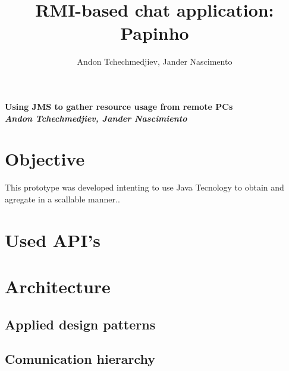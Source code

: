 \documentclass[times, 8pt,twocolumn]{article}
\title {RMI-based chat application: Papinho}
\author{Andon Tchechmedjiev, Jander Nascimento}
\begin{document}
{\Large {\bf Using JMS to gather resource usage from remote PCs}} \\
{\large {\bf {\it Andon Tchechmedjiev, Jander Nascimiento}}}
\section{Objective}
This prototype was developed intenting to use Java Tecnology to obtain and agregate in a scallable manner..
\section{Used API's}
\section{Architecture}
\subsection{Applied design patterns}
\subsection{Comunication hierarchy}
\end{document}
